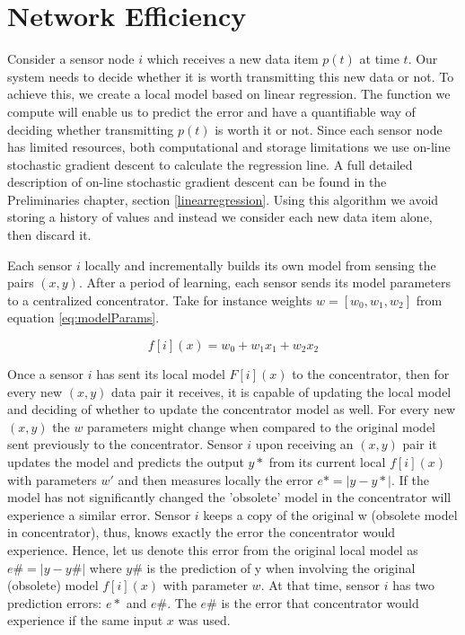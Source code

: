 \documentclass{mproj}
\begin{document}
\section{Network Efficiency}
Consider a sensor node $i$ which receives a new data item $p(t)$ at time $t$. Our system needs to decide whether it is worth transmitting this new data or not. To achieve this, we create a local model based on linear regression. The function we compute will enable us to predict the error and have a quantifiable way of deciding whether transmitting $p(t)$ is worth it or not. Since each sensor node has limited resources, both computational and storage limitations we use on-line stochastic gradient descent to calculate the regression line. A full detailed description of on-line stochastic gradient descent can be found in the Preliminaries chapter, section \ref{linearregression}. Using this algorithm we avoid storing a history of values and instead we consider each new data item alone, then discard it. 

Each sensor $i$ locally and incrementally builds its own model from sensing the pairs $(x,y)$. After a period of learning, each sensor sends its model parameters to a centralized concentrator. Take for instance weights $w=[w_0,w_1,w_2]$ from equation \ref{eq:modelParams}. 

\begin{equation}
\label{eq:modelParams}
f[i](x) = w_0 + w_1x_1 + w_2x_2
\end{equation}

Once a sensor $i$ has sent its local model $F[i](x)$ to the concentrator, then for every new $(x,y)$ data pair it receives, it is capable of updating the local model and deciding of whether to update the concentrator model as well. For every new $(x,y)$ the $w$ parameters might change when compared to the original model sent previously to the concentrator. Sensor $i$ upon receiving an $(x,y)$ pair it updates the model and predicts the output $y*$ from its current local $f[i](x)$ with parameters $w'$ and then measures locally the error $e* = |y-y*|$. If the model has not significantly changed the 'obsolete' model in the concentrator will experience a similar error. Sensor $i$ keeps a copy of the original w (obsolete model in concentrator), thus, knows exactly the error the concentrator would experience. Hence, let us denote this error from the original local model as $e\# = |y - y\#|$ where $y\#$ is the prediction of y when involving the original (obsolete) model $f[i](x)$ with parameter $w$. At that time, sensor $i$ has two prediction errors: $e*$ and $e\#$. The $e\#$ is the error that concentrator would experience if the same input $x$ was used.
\end{document}
